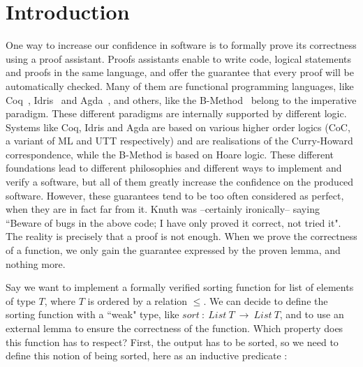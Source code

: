 \section{Introduction}


One way to increase our confidence in software is to formally prove its correctness using a proof assistant. Proofs assistants enable to write code, logical statements and proofs in the same language, and offer the guarantee that every proof will be automatically checked. Many of them are functional programming languages, like Coq~\cite{Bertot2004}, Idris~\cite{brady2013idris} and Agda~\cite{Norell2008}, and others, like the B-Method~\cite{Abrial1991} belong to the imperative paradigm. These different paradigms are internally supported by different logic. Systems like Coq, Idris and Agda are based on various higher order logics (CoC, a variant of ML and UTT respectively) and are realisations of the Curry-Howard correspondence, while the B-Method is based on Hoare logic. These different foundations lead to different philosophies and different ways to implement and verify a software, but all of them greatly increase the confidence on the produced software. However, these guarantees tend to be too often considered as perfect, when they are in fact far from it. Knuth was --certainly ironically-- saying ``Beware of bugs in the above code; I have only proved it correct, not tried it". The reality is precisely that a proof is not enough. When we prove the correctness of a function, we only gain the guarantee expressed by the proven lemma, and nothing more. 

Say we want to implement a formally verified sorting function for list of elements of type $T$, where $T$ is ordered by a relation $\leq$.
We can decide to define the sorting function with a ``weak" type, like $sort\ :\ List\ T\ \rightarrow\ List\ T$, and to use an external lemma to ensure the correctness of the function. Which property does this function has to respect? First, the output has to be sorted, so we need to define this notion of being sorted, here as an inductive predicate :

